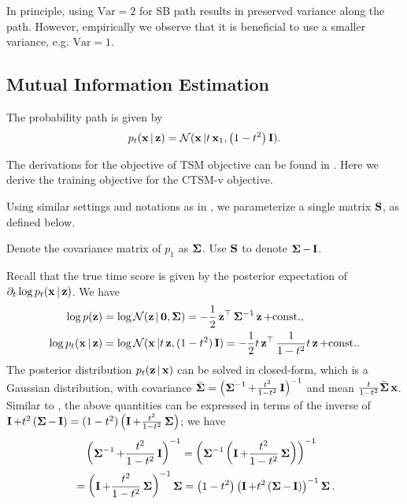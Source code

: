 In principle, using $\text{Var}=2$ for SB path results in preserved variance along the path. However, empirically we observe that it is beneficial to use a smaller variance, e.g. $\text{Var}=1$.



\subsection{Mutual Information Estimation}
\label{sec:mi-estimation}

The probability path is given by
\begin{equation}
p_{t}(\bx|\bz) = \mathcal{N}(\bx|t\bx_{1},\left(1-t^{2}\right)\bI).
\end{equation}

The derivations for the objective of TSM objective can be found in \citet{choi2022densityratio}. Here we derive the training objective for the CTSM-v objective.

Using similar settings and notations as in \citet{choi2022densityratio}, we parameterize a single matrix $\bS$, as defined below.

Denote the covariance matrix of $p_{1}$ as $\bSigma$. Use $\bS$ to denote $\bSigma-\bI$.

Recall that the true time score is given by the posterior expectation of $\partial_{t}\log p_{t}(\bx|\bz)$. We have
\begin{align}
\log p(\bz) &= \log\mathcal{N}(\bz|\bzero,\bSigma) = -\frac{1}{2}\bz^{\top}\bSigma^{-1}\bz+\text{const.},\\
\log p_{t}(\bx|\bz) &= \log\mathcal{N}(\bx|t\bz, (1-t^{2})\bI) = -\frac{1}{2}t\bz^{\top}\frac{1}{1-t^{2}}t\bz + \text{const.}.
\end{align}
The posterior distribution $p_{t}(\bz|\bx)$ can be solved in closed-form, which is a Gaussian distribution, with covariance $\bar{\bSigma} = \left(\bSigma^{-1} + \frac{t^{2}}{1-t^{2}}\bI\right)^{-1}$ and mean $\frac{t}{1-t^{2}}\bar{\bSigma}\bx$. Similar to \citet{choi2022densityratio}, the above quantities can be expressed in terms of the inverse of $\bI + t^{2}\left(\bSigma - \bI\right) = (1-t^{2})\left(\bI + \frac{t^{2}}{1-t^{2}}\bSigma\right)$; we have
\begin{align}
&\quad \left(\bSigma^{-1} + \frac{t^{2}}{1-t^{2}}\bI\right)^{-1} = \left(\bSigma^{-1}\left(\bI + \frac{t^{2}}{1-t^{2}}\bSigma\right)\right)^{-1} \\
&= \left(\bI+\frac{t^{2}}{1-t^{2}}\bSigma\right)^{-1}\bSigma = \left(1-t^{2}\right)\left(\bI + t^{2}\left(\bSigma - \bI\right)\right)^{-1}\bSigma.
\end{align}

